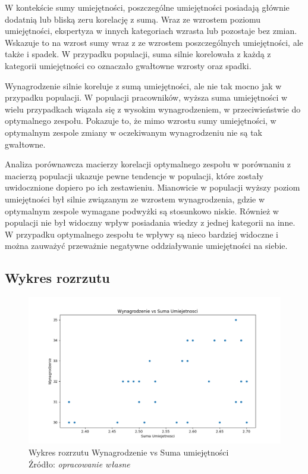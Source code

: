     \par W kontekście sumy umiejętności, poszczególne umiejętności posiadają głównie dodatnią lub bliską zeru korelację z sumą. Wraz ze wzrostem poziomu umiejętności, ekspertyza w innych kategoriach wzrasta lub pozostaje bez zmian. Wskazuje to na wzrost sumy wraz z ze wzrostem poszczególnych umiejętności, ale także i spadek. W przypadku populacji, suma silnie korelowała z każdą z kategorii umiejętności co oznaczało gwałtowne wzrosty oraz spadki.

    \par Wynagrodzenie silnie koreluje z sumą umiejętności, ale nie tak mocno jak w przypadku populacji. W populacji pracowników, wyższa suma umiejętności w wielu przypadkach wiązała się z wysokim wynagrodzeniem, w przeciwieństwie do optymalnego zespołu. Pokazuje to, że mimo wzrostu sumy umiejętności, w optymalnym zespole zmiany w oczekiwanym wynagrodzeniu nie są tak gwałtowne.

    \par Analiza porównawcza macierzy korelacji optymalnego zespołu w porównaniu z macierzą populacji ukazuje pewne tendencje w populacji, które zostały uwidocznione dopiero po ich zestawieniu. Mianowicie w populacji wyższy poziom umiejętności był silnie związanym ze wzrostem wynagrodzenia, gdzie w optymalnym zespole wymagane podwyżki są stosunkowo niskie. Również w populacji nie był widoczny wpływ posiadania wiedzy z jednej kategorii na inne. W przypadku optymalnego zespołu te wpływy są nieco bardziej widoczne i można zauważyć przeważnie negatywne oddziaływanie umiejętności na siebie.
    
    \subsection{Wykres rozrzutu}
    \begin{figure}[H]
        \centering
        \includegraphics[width=\linewidth]{chapters/Images/rozrzut_optimal.png}
        \cprotect\caption{Wykres rozrzutu Wynagrodzenie vs Suma umiejętności\\ Źródło:\textit{ opracowanie własne}}
        \label{fig:scatter_plot_optimal}
    \end{figure}

